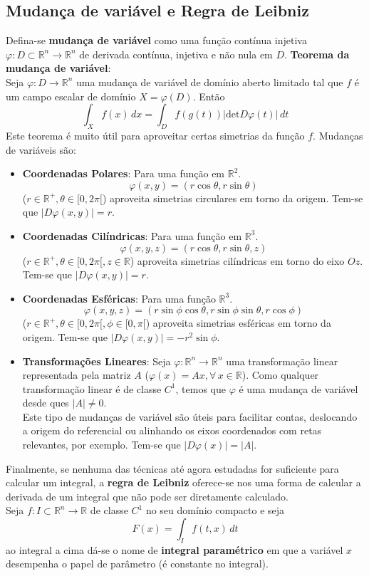 \documentclass{article}
\newcommand{\R}{\mathbb{R}}
\begin{document}
\subsection{Mudança de variável e Regra de Leibniz}
Defina-se \textbf{mudança de variável} como uma função contínua injetiva $\varphi: D \subset \R^n \to \R^n$ de derivada contínua, injetiva e não nula em $D$. 
\textbf{Teorema da mudança de variável}:\\
Seja $\varphi: D \to \R^n$ uma mudança de variável de domínio aberto limitado tal que $f$ é um campo escalar de domínio $X=\varphi(D)$. Então
$$
\int_X f(x) \, dx = \int_D f(g(t)) |\text{det} D \varphi(t)| \, dt
$$
Este teorema é muito útil para aproveitar certas simetrias da função $f$. Mudanças de variáveis são:
\begin{itemize}
	\item \textbf{Coordenadas Polares}: Para uma função em $\R^2$.
	$$
	\varphi (x,y) = (r \cos \theta, r \sin \theta)
	$$
	($r \in \R^+, \theta \in [0, 2\pi[$) aproveita simetrias circulares em torno da origem. Tem-se que $|D\varphi(x,y)| = r$.
	\item \textbf{Coordenadas Cilíndricas}: Para uma função em $\R^3$.
	$$
	\varphi(x,y,z) = (r \cos \theta, r \sin \theta, z)
	$$
	($r \in \R^+, \theta \in [0,2\pi[, z \in \R$) aproveita simetrias cilíndricas em torno do eixo $Oz$. Tem-se que $|D\varphi(x,y)| = r$.
	\item \textbf{Coordenadas Esféricas}: Para uma função $\R^3$.
	$$
	\varphi (x,y,z) = (r \sin \phi \cos \theta, r\sin \phi \sin \theta, r \cos \phi)
	$$
	($r \in \R^+, \theta \in [0,2\pi[, \phi \in [0,\pi[$) aproveita simetrias esféricas em torno da origem. Tem-se que $|D\varphi(x,y)| = -r^2 \sin \phi$.
	\item \textbf{Transformações Lineares}: Seja $\varphi: \R^n \to \R^n$ uma transformação linear representada pela matriz $A$ ($\varphi(x) = Ax, \forall \, x \in \R$). Como qualquer transformação linear é de classe $C^1$, temos que $\varphi$ é uma mudança de variável desde ques $|A| \neq 0$.\\
	Este tipo de mudanças de variável são úteis para facilitar contas, deslocando a origem do referencial ou alinhando os eixos coordenados com retas relevantes, por exemplo. Tem-se que $|D\varphi(x)|=|A|$. 
\end{itemize}
Finalmente, se nenhuma das técnicas até agora estudadas for suficiente para calcular um integral, a \textbf{regra de Leibniz} oferece-se nos uma forma de calcular a derivada de um integral que não pode ser diretamente calculado.\\
Seja $f: I \subset \R^n \to \R$ de classe $C^1$ no seu domínio compacto e seja 
$$
F(x) = \int_I f(t,x) \, dt
$$
ao integral a cima dá-se o nome de \textbf{integral paramétrico} em que a variável $x$ desempenha o papel de parâmetro (é constante no integral).
\end{document}

